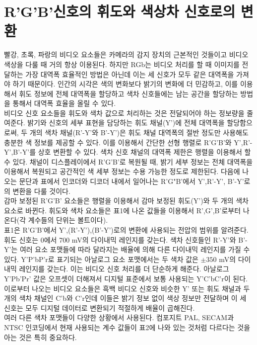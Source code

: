 \section{R'G'B'신호의 휘도와 색상차 신호로의 변환}
빨강, 초록, 파랑의 비디오 요소들은 카메라의 감지 장치의 근본적인 것들이고 비디오 색상을 다룰 때 거의 항상 이용된다.
하지만 RGb는 비디오 처리를 할 때 이미지를 전달하는 가장 대역폭 효율적인 방법은 아닌데 이는 세 신호가 모두 같은 대역폭을 가져야 하기 때문이다.
인간의 시각은 색의 변화보다 밝기의 변화에 더 민감하고, 이를 이용해서 휘도 정보에 전체 대역폭을 할당하고 색차 신호들에는 남는 공간을 할당하는 방법을 통해서 대역폭 효율을 올릴 수 있다.
\\
비디오 신호 요소들을 휘도와 색차 값으로 처리하는 것은 전달되어야 하는 정보량을 줄여준다. 밝기와 신호의 세부 표현을 담당하는 휘도 채널(Y')에 전체 대역폭을 할당함으로써, 두 개의 색차 채널(R'-Y'와 B'-Y')은 휘도 채널 대역폭의 절반 정도만 사용해도 충분한 색 정보를 제공할 수 있다.
이를 이용해서 간단한 선형 행렬로 R'G'B'와 Y',R'-Y',B'-Y'를 상호 변환할 수 있다. 색차 신호 채널의 대역폭 제한은 행렬을 이용해서 할 수 있다.
채널이 디스플레이에서 R'G'B'로 복원될 때, 밝기 세부 정보는 전체 대역폭을 이용해서 복원되고 공간적인 색 세부 정보는 수용 가능한 정도로 제한된다.
다음에 나오는 문단과 표에서 인코더와 디코더 내에서 일어나는 R'G"B'에서 Y',R'-Y', B'-Y'로의 변환을 다룰 것이다.
\\
감마 보정된 R'G'B' 요소들은 행렬을 이용해서 감마 보정된 휘도(Y')와 두 개의 색차 요소로 바뀐다. 휘도와 색차 요소들은 {표1}에 나온 값들을 이용해서 R',G',B'로부터 나온다(각 계수들의 단위는 볼트이다).
\\
{표1}은 R'G'B'에서 Y',(R'-Y'),(B'-Y')로의 변환에 사용되는 전압의 범위를 알려준다. 휘도 신호는 0에서 700 mV의 다이내믹 레인지를 갖는다.
색차 신호들인 R'-Y'와 B'-Y'는 여러 요소 포맷들에 따라 달라지는 배율에 의해 다른 다이내믹 레인지를 가질 수 있다. Y'P'bP'r로 표기되는 아날로그 요소 포맷에서는 두 색차 값은 $\pm 350$ mV의 다이내믹 레인지를 갖는다. 이는 비디오 신호 처리를 더 단순하게 해준다.
아날로그 Y'Pb'Pr' 값은 오프셋이 더해져서 디지털 표준에서 보통 사용되는 Y'C'bC'r이 된다. 이로부터 나오는 비디오 요소들은 흑백 비디오 신호와 비슷한 Y' 또는 휘도 채널과 두 개의 색차 채널인 C'b와 C'r인데 이들은 밝기 정보 없이 색상 정보만 전달하며 이 세 신호는 모두 디지털 데이터로 변환되기 적절하게 배율이 곱해진다.
\\
여러 다른 색차 포맷들이 다양한 상황에서 사용된다. 컴포지트 PAL, SECAM과 NTSC 인코딩에서 현재 사용되는 계수 값들이 {표2}에 나와 있는 것처럼 다르다는 것을 아는 것은 특히 중요하다.
